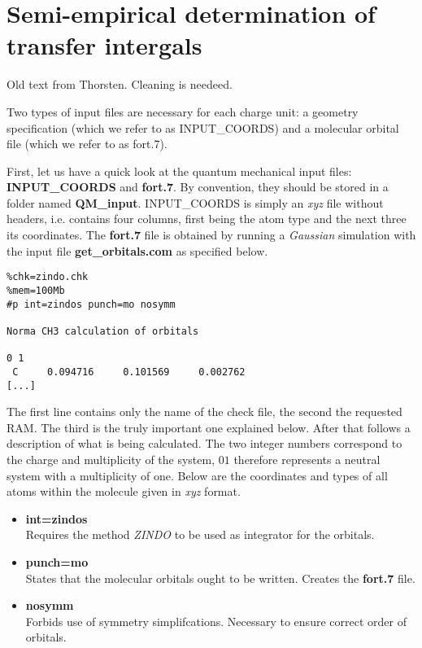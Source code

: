 \section{Semi-empirical determination of transfer intergals}

{\color{red} Old text from Thorsten. Cleaning is needeed.}

Two types of input files are necessary for each charge unit: a geometry specification (which we refer to as INPUT\_COORDS) and a molecular orbital file (which we refer to as fort.7).

First, let us have a quick look at the quantum mechanical input files: {\bf INPUT\_COORDS} and {\bf fort.7}. By convention, they should be stored in a folder named {\bf QM\_input}. INPUT\_COORDS is simply an \emph{xyz} file without headers, i.e. contains four columns, first being the atom type and the next three its coordinates. The {\bf fort.7} file is obtained by running a \emph{Gaussian} simulation with the input file {\bf get\_orbitals.com} as specified below.

\begin{verbatim}
%chk=zindo.chk
%mem=100Mb
#p int=zindos punch=mo nosymm

Norma CH3 calculation of orbitals

0 1
 C     0.094716     0.101569     0.002762
[...]
\end{verbatim}

The first line contains only the name of the check file,
the second the requested RAM. The third is the truly important
one explained below. After that follows a description of what
is being calculated. The two integer numbers correspond to the
charge and multiplicity of the system, $0 1$ therefore represents
a neutral system with a multiplicity of one. Below are the coordinates
and types of all atoms within the molecule given in \emph{xyz} format.

\begin{itemize}
 \item {\bf int=zindos} \\
        Requires the method \emph{ZINDO} to be used as integrator for the orbitals.
 \item {\bf punch=mo} \\
        States that the molecular orbitals ought to be written. Creates the {\bf fort.7} file.
 \item {\bf nosymm} \\
        Forbids use of symmetry simplifcations. Necessary to ensure correct order of orbitals.
\end{itemize}

